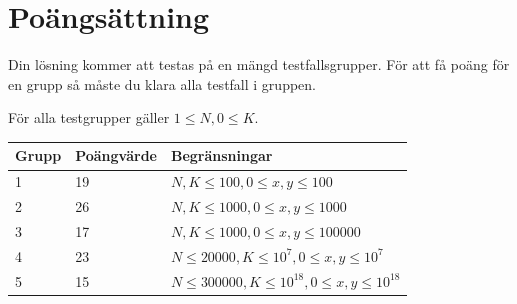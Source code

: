 \section*{Poängsättning}
Din lösning kommer att testas på en mängd testfallsgrupper. För att få poäng för en grupp så måste du klara alla testfall i gruppen.

För alla testgrupper gäller $1 \le N, 0 \le K$.

\begin{tabular}{| l | l | l |}
	\hline
	Grupp & Poängvärde & Begränsningar\\ \hline
	1 & 19 & $N, K \le 100, 0 \le x, y \le 100$ \\ \hline
	2 & 26 & $N, K \le 1000, 0 \le x, y \le 1000$ \\ \hline
	3 & 17 & $N, K \le 1000, 0 \le x, y \le 100000$ \\ \hline
	4 & 23 & $N \le 20000, K \le 10^7, 0 \le x, y \le 10^7$ \\ \hline
	5 & 15 & $N \le 300000, K \le 10^{18}, 0 \le x, y \le 10^{18}$ \\ \hline
\end{tabular}
